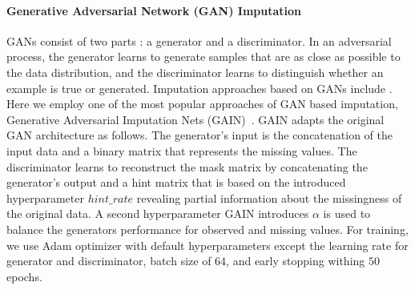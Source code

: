 


\paragraph{Generative Adversarial Network (GAN) Imputation}
%
GANs consist of two parts \citep{GAN}: a generator and a discriminator. In an adversarial process, the generator learns to generate samples that are as close as possible to the data distribution, and the discriminator learns to distinguish whether an example is true or generated. Imputation approaches based on GANs include \cite{GAIN, VIGAN, MisGAN}.
Here we employ one of the most popular approaches of GAN based imputation, Generative Adversarial Imputation Nets (GAIN)~\citep{GAIN}.
GAIN adapts the original GAN architecture as follows. The generator's input is the concatenation of the input data and a binary matrix that represents the missing values. The discriminator learns to reconstruct the mask matrix by concatenating the generator's output and a hint matrix that is based on the introduced hyperparameter $hint\_rate$ revealing partial information about the missingness of the original data. A second hyperparameter GAIN introduces $\alpha$ is used to balance the generators performance for observed and missing values.
For training, we use Adam optimizer with default hyperparameters except the learning rate for generator and discriminator, batch size of $64$, and early stopping withing $50$ epochs.

